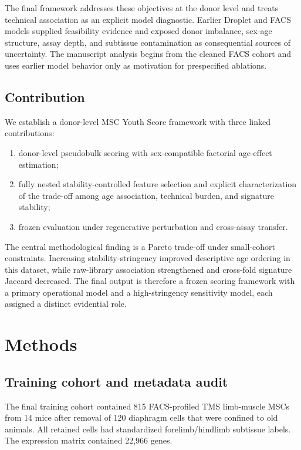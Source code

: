 \documentclass[10pt,twocolumn]{article}
\providecommand{\tightlist}{\setlength{\itemsep}{0pt}\setlength{\parskip}{0pt}}
\begin{document}
The final framework addresses these objectives at the donor level and treats technical association as an explicit model diagnostic. Earlier Droplet and FACS models supplied feasibility evidence and exposed donor imbalance, sex-age structure, assay depth, and subtissue contamination as consequential sources of uncertainty. The manuscript analysis begins from the cleaned FACS cohort and uses earlier model behavior only as motivation for prespecified ablations.

\subsection{Contribution}\label{contribution}

We establish a donor-level MSC Youth Score framework with three linked contributions:

\begin{enumerate}
\def\labelenumi{\arabic{enumi}.}
\tightlist
\item
  donor-level pseudobulk scoring with sex-compatible factorial age-effect estimation;
\item
  fully nested stability-controlled feature selection and explicit characterization of the trade-off among age association, technical burden, and signature stability;
\item
  frozen evaluation under regenerative perturbation and cross-assay transfer.
\end{enumerate}

The central methodological finding is a Pareto trade-off under small-cohort constraints. Increasing stability-stringency improved descriptive age ordering in this dataset, while raw-library association strengthened and cross-fold signature Jaccard decreased. The final output is therefore a frozen scoring framework with a primary operational model and a high-stringency sensitivity model, each assigned a distinct evidential role.

\section{Methods}\label{methods}

\subsection{Training cohort and metadata audit}\label{training-cohort-and-metadata-audit}

The final training cohort contained 815 FACS-profiled TMS limb-muscle MSCs from 14 mice after removal of 120 diaphragm cells that were confined to old animals. All retained cells had standardized forelimb/hindlimb subtissue labels. The expression matrix contained 22,966 genes.
\end{document}
